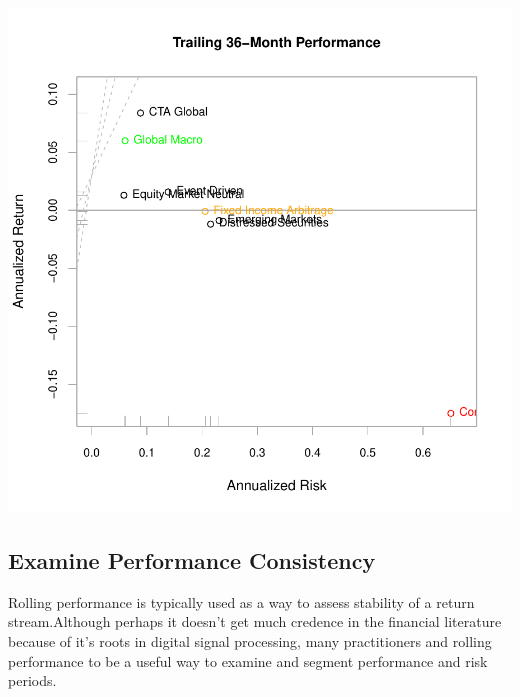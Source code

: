\documentclass[12pt,letterpaper,english]{article}
\begin{document}
\includegraphics{UnSmoothReturnAnalysis-Graph4}

\subsection{Examine Performance Consistency}

Rolling performance is typically used as a way to assess stability of a return stream.Although perhaps it doesn't get much credence in the financial literature because of it's roots in digital signal processing, many practitioners and rolling performance to be a useful way to examine and segment performance and risk periods.
\end{document}
